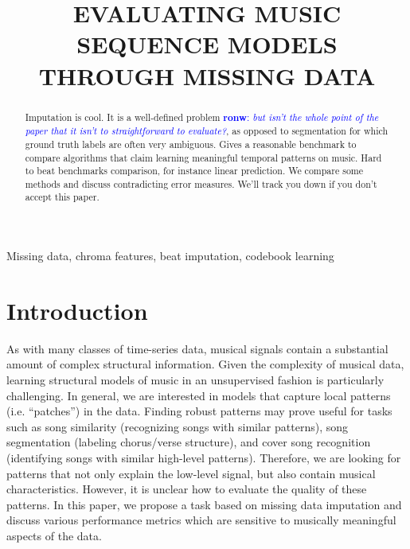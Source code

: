 \documentclass{article}
\title{EVALUATING MUSIC SEQUENCE MODELS THROUGH MISSING DATA}
\newcommand{\FIXME}[2][FIXME]{\textcolor{blue}{\textbf{#1}: \emph{#2}}}
\begin{document}
\ninept
%
\maketitle
%
\begin{abstract}
Imputation is cool. It is a well-defined problem
\FIXME[ronw]{but isn't the whole point of the paper
that it isn't to straightforward to evaluate?},
as opposed to segmentation for which ground truth labels are often
very ambiguous.
%
Gives a reasonable benchmark to compare algorithms that claim learning meaningful
temporal patterns on music. Hard to beat benchmarks comparison, for instance linear
prediction. We compare some methods and discuss contradicting error measures. 
We'll track you down if you don't accept this paper.
\end{abstract}
%
\begin{keywords}
Missing data, chroma features, beat imputation, codebook learning
\end{keywords}
%


\section{Introduction}
\label{sec:intro}
As with many classes of time-series data, musical signals contain a
substantial amount of complex structural information.  Given the
complexity of musical data, learning structural models of music in an
unsupervised fashion is particularly challenging.  In general, we are
interested in models that capture local patterns (i.e. ``patches'') in
the data.  Finding robust patterns may prove useful for tasks such as
song similarity (recognizing songs with similar patterns), song
segmentation (labeling chorus/verse structure), and cover song
recognition (identifying songs with similar high-level patterns).
Therefore, we are looking for patterns that not only explain the
low-level signal, but also contain musical characteristics.  However,
it is unclear how to evaluate the quality of these patterns.  In this
paper, we propose a task based on missing data imputation and discuss
various performance metrics which are sensitive to musically
meaningful aspects of the data.
\end{document}
